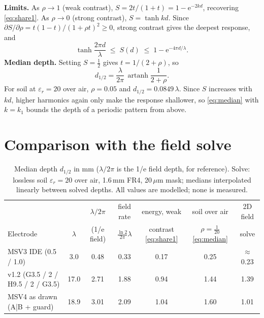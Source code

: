 \documentclass[11pt,letterpaper]{article}
\newcommand{\e}{\mathrm{e}}
\begin{document}
\textbf{Limits.} As $\rho \to 1$ (weak contrast), $S = 2t/(1+t) = 1 - \e^{-2kd}$, recovering
\eqref{eq:share1}. As $\rho \to 0$ (strong contrast), $S = \tanh kd$. Since $\partial S/\partial\rho = t(1-t)/(1+\rho t)^2 \ge 0$,
strong contrast gives the deepest response, and
\begin{equation}
  \tanh\frac{2\pi d}{\lambda} \;\le\; S(d) \;\le\; 1 - \e^{-4\pi d/\lambda}.
  \label{eq:sandwich}
\end{equation}
\textbf{Median depth.} Setting $S = \tfrac12$ gives $t = 1/(2+\rho)$, so
\begin{equation}
  d_{1/2} = \frac{\lambda}{2\pi}\,\operatorname{artanh}\frac{1}{2+\rho}.
  \label{eq:median}
\end{equation}
For soil at $\varepsilon_r = 20$ over air, $\rho = 0.05$ and $d_{1/2} = 0.0849\,\lambda$. Since $S$
increases with $kd$, higher harmonics again only make the response shallower, so \eqref{eq:median} with
$k = k_1$ bounds the depth of a periodic pattern from above.

\section{Comparison with the field solve}

\begin{table}[h]
\centering
\small
\setlength{\tabcolsep}{5pt}
\renewcommand{\arraystretch}{1.25}
\begin{tabular}{@{}lcccccc@{}}
\toprule
 & & $\lambda/2\pi$ & field rate & energy, weak & soil over air & 2D field \\
Electrode & $\lambda$ & (1/e field) & $\tfrac{\ln 2}{2\pi}\lambda$ & contrast \eqref{eq:share1} &
$\rho = \tfrac{1}{20}$ \eqref{eq:median} & solve \\
\midrule
MSV3 IDE (0.5 / 1.0)                & 3.0  & 0.48 & 0.33 & 0.17 & 0.25 & $\approx$0.23 \\
v1.2 (G3.5 / 2 / H9.5 / 2 / G3.5)   & 17.0 & 2.71 & 1.88 & 0.94 & 1.44 & 1.39 \\
MSV4 as drawn (A|B + guard) & 18.9 & 3.01 & 2.09 & 1.04 & 1.60 & 1.01 \\
\bottomrule
\end{tabular}
\caption{Median depth $d_{1/2}$ in mm ($\lambda/2\pi$ is the 1/e field depth, for reference). Solve:
lossless soil $\varepsilon_r = 20$ over air, 1.6\,mm FR4, 20\,$\mu$m mask; medians interpolated linearly
between solved depths. All values are modelled; none is measured.}
\end{table}
\end{document}
